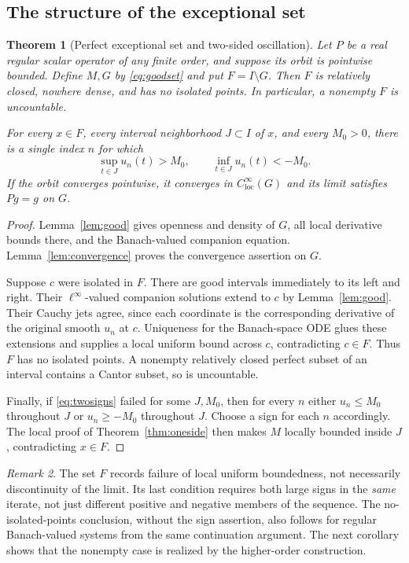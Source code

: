 \documentclass[11pt,reqno]{amsart}
\numberwithin{equation}{section}
\newtheorem{theorem}{Theorem}[section]
\theoremstyle{definition}
\theoremstyle{remark}
\newtheorem{remark}[theorem]{Remark}
\newcommand{\loc}{\mathrm{loc}}
\newcommand{\clim}{C^\infty_{\loc}}
\begin{document}
\subsection{The structure of the exceptional set}
\begin{theorem}[Perfect exceptional set and two-sided oscillation]\label{thm:exceptional}
Let $P$ be a real regular scalar operator of any finite order, and suppose its orbit is pointwise bounded. Define $M,G$ by \eqref{eq:goodset} and put $F=I\setminus G$. Then $F$ is relatively closed, nowhere dense, and has no isolated points. In particular, a nonempty $F$ is uncountable.

For every $x\in F$, every interval neighborhood $J\subset I$ of $x$, and every $M_0>0$, there is a single index $n$ for which
\begin{equation}\label{eq:twosigns}
 \sup_{t\in J}u_n(t)>M_0,
 \qquad
 \inf_{t\in J}u_n(t)<-M_0.
\end{equation}
If the orbit converges pointwise, it converges in $\clim(G)$ and its limit satisfies $Pg=g$ on $G$.
\end{theorem}
\begin{proof}
Lemma~\ref{lem:good} gives openness and density of $G$, all local derivative bounds there, and the Banach-valued companion equation. Lemma~\ref{lem:convergence} proves the convergence assertion on $G$.

Suppose $c$ were isolated in $F$. There are good intervals immediately to its left and right. Their $\ell^\infty$-valued companion solutions extend to $c$ by Lemma~\ref{lem:good}. Their Cauchy jets agree, since each coordinate is the corresponding derivative of the original smooth $u_n$ at $c$. Uniqueness for the Banach-space ODE glues these extensions and supplies a local uniform bound across $c$, contradicting $c\in F$. Thus $F$ has no isolated points. A nonempty relatively closed perfect subset of an interval contains a Cantor subset, so is uncountable.

Finally, if \eqref{eq:twosigns} failed for some $J,M_0$, then for every $n$ either $u_n\le M_0$ throughout $J$ or $u_n\ge-M_0$ throughout $J$. Choose a sign for each $n$ accordingly. The local proof of Theorem~\ref{thm:oneside} then makes $M$ locally bounded inside $J$, contradicting $x\in F$.
\end{proof}

\begin{remark}
The set $F$ records failure of local uniform boundedness, not necessarily discontinuity of the limit. Its last condition requires both large signs in the \emph{same} iterate, not just different positive and negative members of the sequence. The no-isolated-points conclusion, without the sign assertion, also follows for regular Banach-valued systems from the same continuation argument. The next corollary shows that the nonempty case is realized by the higher-order construction.
\end{remark}
\end{document}
